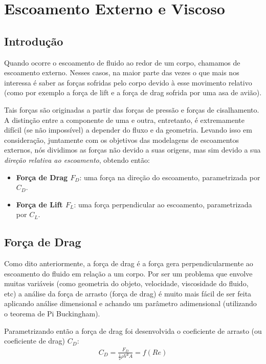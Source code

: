 \documentclass{article}
\begin{document}
\section{Escoamento Externo e Viscoso}
\subsection{Introdução}

Quando ocorre o escoamento de fluido ao redor de um corpo, chamamos de escoamento externo. Nesses casos, na maior parte das vezes o que mais nos interessa é saber as forças sofridas pelo corpo devido à esse movimento
relativo (como por exemplo a força de lift e a força de drag sofrida por uma asa de avião).

Tais forças são originadas a partir das forças de pressão e forças de cisalhamento. A distinção entre a componente de uma e outra, entretanto, é extremamente difícil (se não impossível) a depender do fluxo e da geometria.
Levando isso em consideração, juntamente com os objetivos das modelagens de escoamentos externos, nós dividimos as forças não devido a suas origens, mas sim devido a sua \emph{direção relativa ao escoamento}, obtendo então:
\begin{itemize}
    \item \textbf{Força de Drag $F_D$}: uma força na direção do escoamento, parametrizada por $C_D$.
    \item \textbf{Força de Lift $F_L$}: uma força perpendicular ao escoamento, parametrizada por $C_L$.
\end{itemize}

\subsection{Força de Drag}
Como dito anteriormente, a força de drag é a força gera perpendicularmente ao escoamento do fluido em relação a um corpo. Por ser um problema que envolve muitas variáveis
(como geometria do objeto, velocidade, viscosidade do fluido, etc) a análise da força de arrasto (força de drag) é muito mais fácil de ser feita aplicando análise dimensional e achando um parâmetro adimensional (utilizando o teorema de Pi Buckingham).

Parametrizando então a força de drag foi desenvolvida o coeficiente de arrasto (ou coeficiente de drag) $C_D$:
\begin{align}
    C_D = \frac{F_D}{\frac{1}{2}\rho V^2 A} = f(Re)
\end{align}
\end{document}
